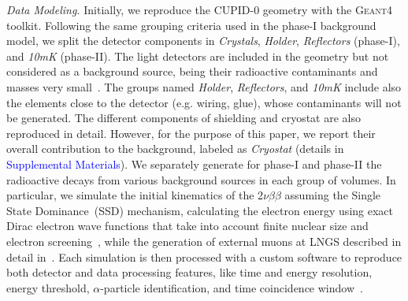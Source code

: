 \documentclass[%
reprint,
superscriptaddress,
altaffilletter,
showpacs,
showkeys,
amsmath, amssymb, aps,prl, floatfix
]{revtex4-1}
\newcommand{\vv}{2$\nu\beta\beta$\xspace}
\newcommand{\phone}{phase-I\xspace}
\newcommand{\phtwo}{phase-II\xspace}
\begin{document}
{\it Data Modeling.} %
Initially, we reproduce the CUPID-0 geometry with the \textsc{Geant4} toolkit. 
Following the same grouping criteria used in the \phone background model, we split the detector components in \textit{Crystals}, \textit{Holder}, \textit{Reflectors} (\phone), and \textit{10mK} (\phtwo).
The light detectors are included in the geometry but not considered as a background source, being their radioactive contaminants and masses very small~\cite{Azzolini:2019nmi}. 
The groups named \textit{Holder}, \textit{Reflectors}, and \textit{10mK} include also the elements close to the detector (e.g. wiring, glue), whose contaminants will not be generated.
The different components of shielding and cryostat are also reproduced in detail. However, for the purpose of this paper, we report their overall contribution to the background, labeled as \textit{Cryostat} (details in \textcolor{blue}{Supplemental Materials}).
We separately generate for \phone and \phtwo the radioactive decays from various background sources in each group of volumes. %
In particular, we simulate the initial kinematics of the \vv assuming the Single State Dominance~(SSD) mechanism, calculating the electron energy using exact Dirac electron wave functions that take into account finite nuclear size and electron screening~\cite{Kotila:2012zza}, while the generation of external muons at LNGS described in detail in~\cite{CUORICINO:2009zeh}.
Each simulation is then processed with a custom software to reproduce both detector and data processing features, like time and energy resolution, energy threshold, $\alpha$-particle identification, and time coincidence window~\cite{Azzolini:2018yye}.
\end{document}
